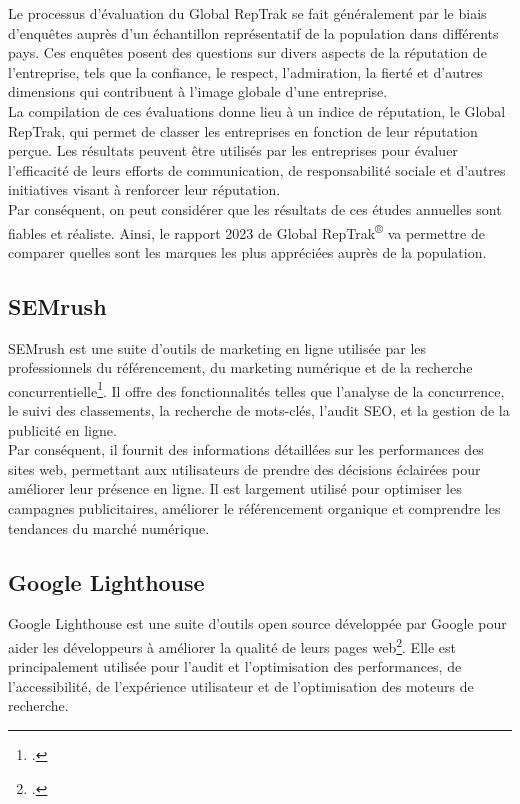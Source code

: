 \documentclass[12pt, a4paper]{report}
\begin{document}
Le processus d'évaluation du Global RepTrak se fait généralement par le biais d'enquêtes auprès d'un échantillon représentatif de la population dans différents pays. Ces enquêtes posent des questions sur divers aspects de la réputation de l'entreprise, tels que la confiance, le respect, l'admiration, la fierté et d'autres dimensions qui contribuent à l'image globale d'une entreprise.\\

La compilation de ces évaluations donne lieu à un indice de réputation, le Global RepTrak, qui permet de classer les entreprises en fonction de leur réputation perçue. Les résultats peuvent être utilisés par les entreprises pour évaluer l'efficacité de leurs efforts de communication, de responsabilité sociale et d'autres initiatives visant à renforcer leur réputation.\\

Par conséquent, on peut considérer que les résultats de ces études annuelles sont fiables et réaliste. Ainsi, le rapport 2023 de Global RepTrak\textsuperscript{\tiny{®}} va permettre de comparer quelles sont les marques les plus appréciées auprès de la population.

\subsection{SEMrush}

SEMrush est une suite d'outils de marketing en ligne utilisée par les professionnels du référencement, du marketing numérique et de la recherche concurrentielle\footcite{noauthor_semrush_2023}. Il offre des fonctionnalités telles que l'analyse de la concurrence, le suivi des classements, la recherche de mots-clés, l'audit SEO, et la gestion de la publicité en ligne.\\

Par conséquent, il fournit des informations détaillées sur les performances des sites web, permettant aux utilisateurs de prendre des décisions éclairées pour améliorer leur présence en ligne. Il est largement utilisé pour optimiser les campagnes publicitaires, améliorer le référencement organique et comprendre les tendances du marché numérique.

\subsection{Google Lighthouse}

Google Lighthouse est une suite d'outils open source développée par Google pour aider les développeurs à améliorer la qualité de leurs pages web\footcite{noauthor_google_2023}. Elle est principalement utilisée pour l'audit et l'optimisation des performances, de l'accessibilité, de l'expérience utilisateur et de l'optimisation des moteurs de recherche.\\
\end{document}

